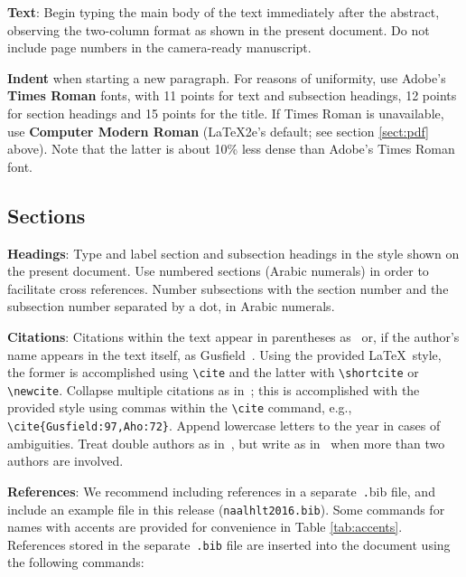 \documentclass[11pt,letterpaper]{article}
\begin{document}
{\bf Text}: Begin typing the main body of the text immediately after
the abstract, observing the two-column format as shown in 
the present document.  Do not include page numbers in the camera-ready manuscript.  

{\bf Indent} when starting a new paragraph. For reasons of uniformity,
use Adobe's {\bf Times Roman} fonts, with 11 points for text and 
subsection headings, 12 points for section headings and 15 points for
the title.  If Times Roman is unavailable, use {\bf Computer Modern
  Roman} (\LaTeX2e{}'s default; see section \ref{sect:pdf} above).
Note that the latter is about 10\% less dense than Adobe's Times Roman
font.

\subsection{Sections}

{\bf Headings}: Type and label section and subsection headings in the
style shown on the present document.  Use numbered sections (Arabic
numerals) in order to facilitate cross references. Number subsections
with the section number and the subsection number separated by a dot,
in Arabic numerals. 

{\bf Citations}: Citations within the text appear
in parentheses as~\cite{Gusfield:97} or, if the author's name appears in
the text itself, as Gusfield~.  Using the provided \LaTeX\ style, the former is accomplished using
{\small\verb|\cite|} and the latter with {\small\verb|\shortcite|} or {\small\verb|\newcite|}.  Collapse multiple citations as in~\cite{Gusfield:97,Aho:72}; this is accomplished with the provided style using commas within the {\small\verb|\cite|} command, e.g., {\small\verb|\cite{Gusfield:97,Aho:72}|}.  
Append lowercase letters to the year in cases of ambiguities.  
Treat double authors as in~\cite{Aho:72}, but write as 
in~\cite{Chandra:81} when more than two authors are involved.  

\textbf{References}:  We recommend
including references in a separate~{\small\texttt .bib} file, and include an example file 
in this release ({\small\tt naalhlt2016.bib}).  Some commands
for names with accents are provided for convenience in Table \ref{tab:accents}.  
References stored in the separate~{\small\tt .bib} file are inserted into the document using the following commands:

\small
\begin{verbatim}


\end{verbatim}
\normalsize 
\end{document}
